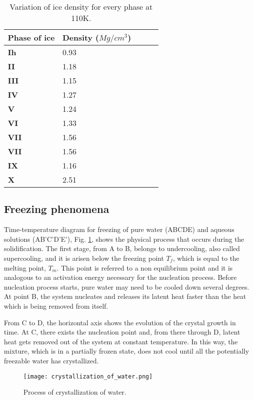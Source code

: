 \begin{table}[h!]
	\begin{tabular}{@{}lllll@{}}
		\toprule[1pt]
		\textbf{Phase of ice} & \textbf{Density ($Mg/cm^{3}$)} \\ \midrule[2pt]
		\textbf{Ih} &  0.93 \\
		\textbf{II} &  1.18 \\
		\textbf{III} & 1.15  \\
		\textbf{IV} & 1.27  \\
		\textbf{V} &  1.24 \\
		\textbf{VI} & 1.33  \\
		\textbf{VII} & 1.56	\\
		\textbf{VII} & 1.56	\\
		\textbf{IX} & 1.16  \\
		\textbf{X} &  2.51 \\  \bottomrule[1pt]		
	\end{tabular}
	\centering
	\caption{Variation of ice density for every phase at 110K.}	
	\label{1.1tab}
\end{table}
\subsection{Freezing phenomena}
\setlength{\parindent}{0.5cm} Time-temperature diagram for freezing of pure water (ABCDE) and aqueous solutions (AB'C'D'E'), Fig.  \ref{1.7fig}, shows the physical process that occurs during the solidification. The first stage, from A to B, belongs to undercooling, also called supercooling, and it is arisen below the freezing point $T_f$, which is equal to the melting point, $T_m$. This point is referred to a non equilibrium point and it is analogous to an activation energy necessary for the nucleation process. Before nucleation process starts, pure water may need to be cooled down several degrees. At point B, the system nucleates and releases its latent heat faster than the heat which is being removed from itself.

\noindent From C to D, the horizontal axis shows the evolution of the crystal growth in time. At C, there exists the nucleation point and, from there through D, latent heat gets removed out of the system at constant temperature. In this way, the mixture, which is in a partially frozen state, does not cool until all the potentially freezable water has crystallized.
\clearpage

\begin{figure}[h]
	\centering
	\texttt{[image: crystallization\_of\_water.png]}
	\caption{Process of crystallization of water.}
	\label{1.7fig}	
\end{figure} 


